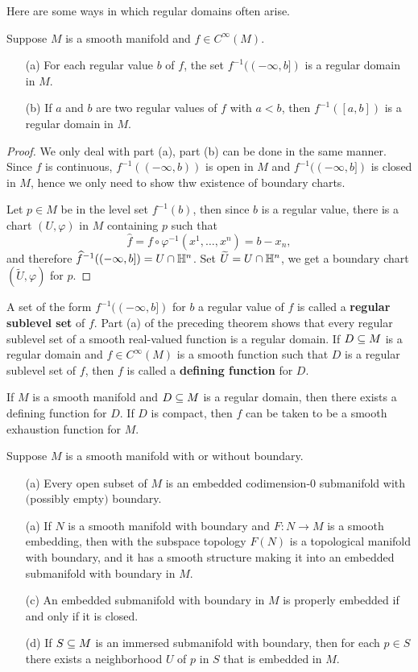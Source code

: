 Here are some ways in which regular domains often arise.
\begin{proposition}\label{regular domain}
Suppose $M$ is a smooth manifold and $f\in C^\infty(M)$.
\begin{itemize}
\item[(a)]For each regular value $b$ of $f$, the set $f^{-1}((-\infty,b])$ is a regular domain in $M$.
\item[(b)]If $a$ and $b$ are two regular values of $f$ with $a<b$, then $f^{-1}([a,b])$ is a regular domain in $M$.
\end{itemize}
\begin{proof}
We only deal with part (a), part (b) can be done in the same manner. Since $f$ is continuous, $f^{-1}((-\infty,b))$ is open in $M$ and $f^{-1}((-\infty,b])$ is closed in $M$, hence we only need to show thw existence of boundary charts.\par 
Let $p\in M$ be in the level set $f^{-1}(b)$, then since $b$ is a regular value, there is a chart $(U,\varphi)$ in $M$ containing $p$ such that
\[\widehat{f}=f\circ\varphi^{-1}(x^1,\dots,x^n)=b-x_n,\]
and therefore $\widehat{f}^{-1}((-\infty,b])=U\cap\mathbb{H}^n$. Set $\widetilde{U}=U\cap \mathbb{H}^n$, we get a boundary chart $(\widetilde{U},\varphi)$ for $p$. 
\end{proof}
\end{proposition}
A set of the form $f^{-1}((-\infty,b])$ for $b$ a regular value of $f$ is called a \textbf{regular sublevel set} of $f$. Part (a) of the preceding theorem shows that every regular sublevel set of a smooth real-valued function is a regular domain. If $D\subseteq M$ is a regular domain and $f\in C^\infty(M)$ is a smooth function such that $D$ is a regular sublevel set of $f$, then $f$ is called a \textbf{defining function} for $D$.
\begin{theorem}
If $M$ is a smooth manifold and $D\subseteq M$ is a regular domain, then there exists a defining function for $D$. If $D$ is compact, then $f$ can be taken to be a smooth exhaustion function for $M$.
\end{theorem}
\begin{proposition}
Suppose $M$ is a smooth manifold with or without boundary.
\begin{itemize}
\item[(a)]Every open subset of $M$ is an embedded codimension-$0$ submanifold with $($possibly empty$)$ boundary.
\item[(a)]If $N$ is a smooth manifold with boundary and $F:N\to M$ is a smooth embedding, then with the subspace topology $F(N)$ is a topological manifold with boundary, and it has a smooth structure making it into an embedded submanifold
with boundary in $M$.
\item[(c)]An embedded submanifold with boundary in $M$ is properly embedded if and
only if it is closed.
\item[(d)]If $S\subseteq M$ is an immersed submanifold with boundary, then for each $p\in S$ there exists a neighborhood $U$ of $p$ in $S$ that is embedded in $M$.
\end{itemize}
\end{proposition}
